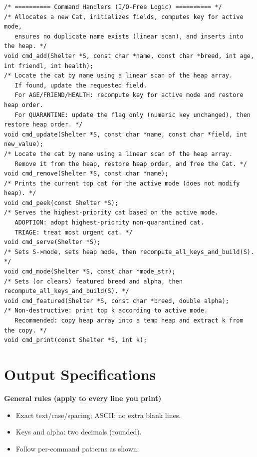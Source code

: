 \documentclass[11pt]{article}
\begin{document}
\begin{codebox}
\begin{lstlisting}
/* ========== Command Handlers (I/O-Free Logic) ========== */
/* Allocates a new Cat, initializes fields, computes key for active mode,
   ensures no duplicate name exists (linear scan), and inserts into the heap. */
void cmd_add(Shelter *S, const char *name, const char *breed, int age, int friendl, int health);
/* Locate the cat by name using a linear scan of the heap array.
   If found, update the requested field.
   For AGE/FRIEND/HEALTH: recompute key for active mode and restore heap order.
   For QUARANTINE: update the flag only (numeric key unchanged), then restore heap order. */
void cmd_update(Shelter *S, const char *name, const char *field, int new_value);
/* Locate the cat by name using a linear scan of the heap array.
   Remove it from the heap, restore heap order, and free the Cat. */
void cmd_remove(Shelter *S, const char *name);
/* Prints the current top cat for the active mode (does not modify heap). */
void cmd_peek(const Shelter *S);
/* Serves the highest-priority cat based on the active mode.
   ADOPTION: adopt highest-priority non-quarantined cat.
   TRIAGE: treat most urgent cat. */
void cmd_serve(Shelter *S);
/* Sets S->mode, sets heap mode, then recompute_all_keys_and_build(S). */
void cmd_mode(Shelter *S, const char *mode_str);
/* Sets (or clears) featured breed and alpha, then recompute_all_keys_and_build(S). */
void cmd_featured(Shelter *S, const char *breed, double alpha);
/* Non-destructive: print top k according to active mode.
   Recommended: copy heap array into a temp heap and extract k from the copy. */
void cmd_print(const Shelter *S, int k);
\end{lstlisting}
\end{codebox}

\newpage

\section*{Output Specifications}
\textbf{General rules (apply to every line you print)}
\begin{itemize}
    \item Exact text/case/spacing; ASCII; no extra blank lines.
    \item Keys and alpha: two decimals (rounded).
    \item Follow per-command patterns as shown.
\end{itemize}
\end{document}
